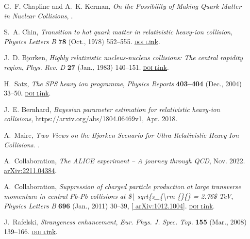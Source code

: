 \documentclass[ALICE,manyauthors]{cernphprep}
\begin{document}
\begin{thebibliography}{100}
G.~F. Chapline and A.~K. Kerman, {\it On the {{Possibility}} of {{Making Quark
  Matter}} in {{Nuclear Collisions}}}, .

S.~A. Chin, {\it Transition to hot quark matter in relativistic heavy-ion
  collision},  {\textsl{Physics Letters B}} {\footnotesize \bf 78} (Oct., 1978)
  552--555. \href{http://dx.doi.org/10.1016/0370-2693(78)90637-8}{\footnotesize
  \textrm{\textsc{doi l}ink}}.

J.~D. Bjorken, {\it Highly relativistic nucleus-nucleus collisions: {{The}}
  central rapidity region},  {\textsl{Phys. Rev. D}} {\footnotesize \bf 27}
  (Jan., 1983) 140--151.
  \href{http://dx.doi.org/10.1103/PhysRevD.27.140}{\footnotesize
  \textrm{\textsc{doi l}ink}}.

H.~Satz, {\it The {{SPS}} heavy ion programme},  {\textsl{Physics Reports}}
  {\footnotesize \bf 403--404} (Dec., 2004) 33--50.
  \href{http://dx.doi.org/10.1016/j.physrep.2004.08.009}{\footnotesize
  \textrm{\textsc{doi l}ink}}.

J.~E. Bernhard, {\it Bayesian parameter estimation for relativistic heavy-ion
  collisions},  https://arxiv.org/abs/1804.06469v1, Apr. 2018.

A.~Maire, {\em Two Views on the {{Bjorken}} Scenario for Ultra-Relativistic
  Heavy-Ion Collisions}.
.

A.~Collaboration, {\it The {{ALICE}} experiment -- {{A}} journey through
  {{QCD}}},  Nov. 2022.
\newblock \href{https://arxiv.org/abs/2211.04384}{{\footnotesize
  arXiv:2211.04384}}.

A.~Collaboration, {\it Suppression of charged particle production at large
  transverse momentum in central {{Pb-Pb}} collisions at \$\textbackslash
  sqrt\{s\_\{\textbackslash rm \vphantom\{\}\vphantom\{\}
  = 2.76\$ {{TeV}}},  {\textsl{Physics Letters B}} {\footnotesize \bf 696}
  (Jan., 2011) 30--39, [\href{https://arxiv.org/abs/1012.1004}{{\footnotesize
  arXiv:1012.1004}}].
  \href{http://dx.doi.org/10.1016/j.physletb.2010.12.020}{\footnotesize
  \textrm{\textsc{doi l}ink}}.

J.~Rafelski, {\it Strangeness enhancement},  {\textsl{Eur. Phys. J. Spec.
  Top.}} {\footnotesize \bf 155} (Mar., 2008) 139--166.
  \href{http://dx.doi.org/10.1140/epjst/e2008-00598-9}{\footnotesize
  \textrm{\textsc{doi l}ink}}.


\end{thebibliography}
\end{document}
